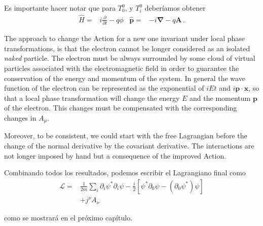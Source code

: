 \begin{subappendices}
\begin{frame}
Es importante hacer notar que para  $T^0_0$, y $T^0_i$ deberíamos obtener
\begin{align}
  \widehat{H}=& i\frac{\partial}{\partial t}-q\phi & \widehat{\mathbf{p}}=&-i\boldsymbol{\nabla}-q\mathbf{A}\,.
\end{align}

\end{frame}


The approach to change the Action for a new one invariant under local phase  transformations, is that the electron cannot be longer considered as an isolated \emph{naked} particle. The electron must be always surrounded by some cloud of virtual particles associated with the electromagnetic field in order to guarantee the conservation of the energy and momentum of the system. In general the wave function of the electron can be represented as the exponential of $iEt$ and $i \mathbf{p}\cdot \mathbf{x}$, so that a local phase transformation will change the energy $E$ and the momentum $\mathbf{p}$ of the electron. This changes must be compensated with the corresponding changes in $A_{\mu}$.

Moreover, to be consistent, we could start with the free Lagrangian before the change of the normal derivative by the covariant derivative. The interactions are not longer imposed by hand but a consequence of the improved Action. 

\begin{frame}
Combinando todos los resultados, podemos escribir el Lagrangiano final como %
\begin{align}
  \mathcal{L}=&\frac{1}{2m}\sum_i\partial_i\psi^*\partial_i\psi
-\frac{i}{2}
  \left[\psi^*\partial_0\psi-(\partial_0\psi^*)\psi\right] \nonumber\\
&+j^\nu A_\nu%
\end{align}

\end{frame}
como se mostrará en el próximo capítulo.


\end{subappendices}

